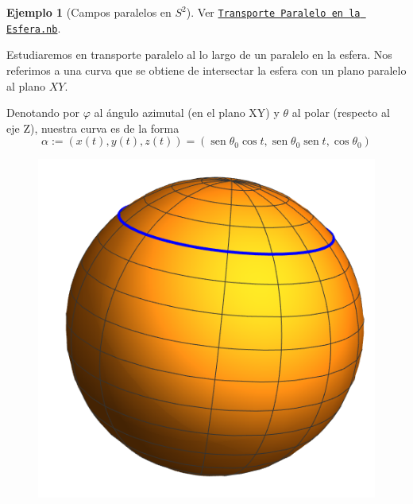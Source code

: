 \documentclass[spanish]{book}
\theoremstyle{definition}
\newtheorem*{ejem}{Ejemplo}
\DeclareMathOperator{\sen}{sen}
\begin{document}
	\begin{ejem}[Campos paralelos en $S^2$]
		
		
		Ver \href{https://github.com/dan-gc/geo-riem/blob/main/Transporte%20Paralelo%20en%20la%20Esfera.nb}{\texttt{Transporte Paralelo en la Esfera.nb}}.
		
		Estudiaremos en transporte paralelo al lo largo de un paralelo en la esfera. Nos referimos a una curva que se obtiene de intersectar la esfera con un plano paralelo al plano $XY$.
		
		Denotando por $\varphi$ al ángulo azimutal (en el plano XY) y $\theta$ al polar (respecto al eje Z), nuestra curva es de la forma
		\[\alpha:=(x(t),y(t),z(t))=(\sen\theta_0\cos t,\sen\theta_0\sen t,\cos\theta_0)\]
		\begin{figure}[H]
			\centering
			\includegraphics[width=0.4\linewidth]{fig14}
			\label{fig:fig14}
		\end{figure}
		

\end{ejem}
\end{document}
